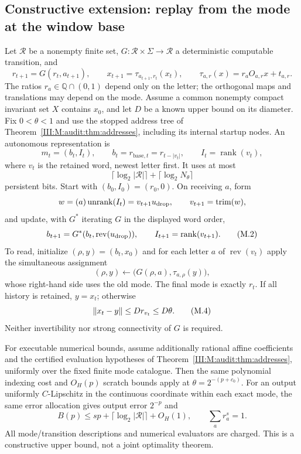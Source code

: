 \subsection{Constructive extension: replay from the mode at the window base}
\begin{proposition}
\label{III:M:audit:prop:checkpoint}
Let $\mathcal R$ be a nonempty finite set, $G:\mathcal R\times\Sigma\to
\mathcal R$ a deterministic computable transition, and
\[
 r_{t+1}=G(r_t,a_{t+1}),\qquad
 x_{t+1}=\tau_{a_{t+1},r_t}(x_t),\qquad
 \tau_{a,r}(x)=r_aO_{a,r}x+t_{a,r}.
\]
The ratios $r_a\in\mathbb Q\cap(0,1)$ depend only on the letter; the
orthogonal maps and translations may depend on the mode. Assume a common
nonempty compact invariant set $X$ contains $x_0$, and let $D$ be a known
upper bound on its diameter. Fix $0<\theta<1$ and use the stopped address
tree of Theorem~\ref{III:M:audit:thm:addresses}, including its internal startup nodes.
An autonomous representation is
\[
 m_t=(b_t,I_t),\qquad b_t=r_{\mathrm{base},t}
       =r_{t-|v_t|},\qquad I_t=\operatorname{rank}(v_t),
\]
where $v_t$ is the retained word, newest letter first. It uses at most
\[
 \lceil\log_2|\mathcal R|\rceil+\lceil\log_2N_\theta\rceil
\]
persistent bits. Start with $(b_0,I_0)=(r_0,0)$. On receiving $a$, form
\[
 w=(a)\operatorname{unrank}(I_t)=v_{t+1}u_{\rm drop},\qquad
 v_{t+1}=\operatorname{trim}(w),
\]
and update, with $G^*$ iterating $G$ in the displayed word order,
\[
 b_{t+1}=G^*(b_t,\operatorname{rev}(u_{\rm drop})),\qquad
 I_{t+1}=\operatorname{rank}(v_{t+1}).                 \tag{M.2}
\]
To read, initialize $(\rho,y)=(b_t,x_0)$ and for each letter $a$ of
$\operatorname{rev}(v_t)$ apply the simultaneous assignment
\[
 (\rho,y)\longleftarrow\bigl(G(\rho,a),\tau_{a,\rho}(y)\bigr),
                                                        \tag{M.3}
\]
whose right-hand side uses the old mode. The final mode is exactly $r_t$.
If all history is retained, $y=x_t$; otherwise
\[
 \left\lVert x_t-y\right\rVert\le D r_{v_t}\le D\theta.               \tag{M.4}
\]
Neither invertibility nor strong connectivity of $G$ is required.

For executable numerical bounds, assume additionally rational affine
coefficients and the certified evaluation hypotheses of
Theorem~\ref{III:M:audit:thm:addresses}, uniformly over the fixed finite mode catalogue.
Then the same polynomial indexing cost and $O_H(p)$ scratch bounds apply
at $\theta=2^{-(p+c_0)}$. For an output uniformly $C$-Lipschitz in the
continuous coordinate within each exact mode, the same error allocation
gives output error $2^{-p}$ and
\[
 B(p)\le sp+\lceil\log_2|\mathcal R|\rceil+O_H(1),
 \qquad \sum_a r_a^s=1.                              \tag{M.5}
\]
All mode/transition descriptions and numerical evaluators are charged.
This is a constructive upper bound, not a joint optimality theorem.
\end{proposition}


